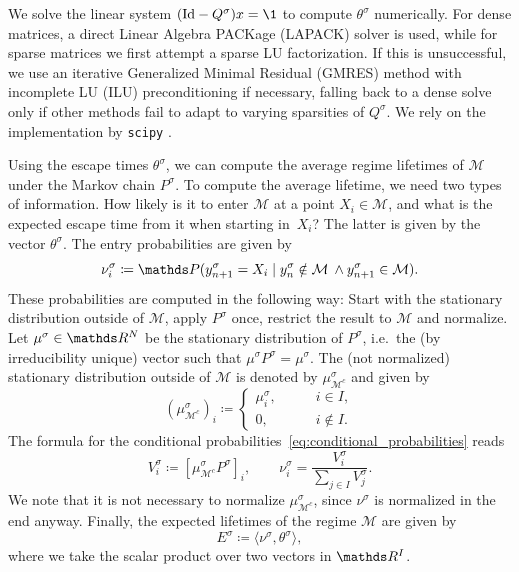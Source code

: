 We solve the linear system $(\Id - Q^{\sigma})x=\1$ to compute $\theta^{\sigma}$ numerically. For dense matrices, a direct Linear Algebra PACKage (LAPACK) solver is used, while for sparse matrices we first attempt a sparse LU factorization. If this is unsuccessful, we use an iterative Generalized Minimal Residual (GMRES) method with incomplete LU (ILU) preconditioning if necessary, falling back to a dense solve only if other methods fail to adapt to varying sparsities of $Q^{\sigma}$. We rely on the implementation by \texttt{scipy} \parencite{virtanenSciPyFundamentalAlgorithms2020}.

Using the escape times $\theta^\sigma$, we can compute the average regime lifetimes of $\mathcal{M}$ under the Markov chain $P^\sigma$. To compute the average lifetime, we need two types of information. How likely is it to enter $\mathcal{M}$ at a point $X_i \in \mathcal{M}$, and what is the expected escape time from it when starting in~$X_i$? The latter is given by the vector $\theta^\sigma$. The entry probabilities are given by
\begin{equation}\label{eq:conditional_probabilities}
    \nu_i^\sigma \coloneqq \P(y_{n+1}^\sigma = X_i \mid y_n^\sigma \notin \mathcal{M} \: \land y_{n+1}^\sigma \in \mathcal{M} ).
\end{equation}
These probabilities are computed in the following way: Start with the stationary distribution outside of $\mathcal{M}$, apply $P^\sigma$ once, restrict the result to $\mathcal{M}$ and normalize. Let $\mu^\sigma \in \R^N$ be the stationary distribution of $P^\sigma$, i.e.~the (by irreducibility unique) vector such that $\mu^\sigma P^\sigma = \mu^\sigma$. The (not normalized) stationary distribution outside of $\mathcal{M}$ is denoted by $\mu^\sigma_{\mathcal{M}^c}$ and given by
\begin{equation}
    \left(\mu^\sigma_{\mathcal{M}^c}\right)_i \coloneqq \begin{cases}
        \mu^\sigma_i, \qquad & i \in I,    \\
        0, \qquad            & i \notin I.
    \end{cases}
\end{equation}
The formula for the conditional probabilities~\eqref{eq:conditional_probabilities} reads
\begin{equation}\label{eq:def_nu}
    V_i^\sigma \coloneqq [ \mu^\sigma_{\mathcal{M}^c} P^\sigma]_i, \qquad \nu_i^\sigma = \frac{V_i^\sigma}{\sum_{j\in I} V_j^\sigma}.
\end{equation}
We note that it is not necessary to normalize $\mu^\sigma_{\mathcal{M}^c}$, since $\nu^\sigma$ is normalized in the end anyway. Finally, the expected lifetimes of the regime $\mathcal{M}$ are given by
\begin{equation} \label{eq:expRegLif}
    E^\sigma \coloneqq \langle\nu^\sigma, \theta^\sigma\rangle,
\end{equation}
where we take the scalar product over two vectors in $\R^I$.

